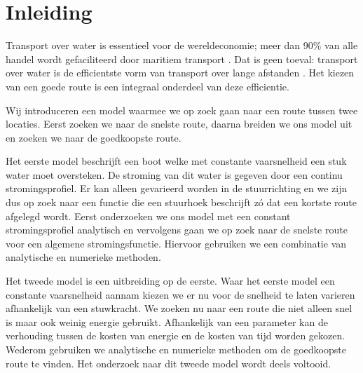\chapter{Inleiding}
Transport over water is essentieel voor de wereldeconomie; meer dan 90\% van alle handel wordt gefaciliteerd door maritiem transport \cite{wereldwijdeHandel}. Dat is geen toeval: transport over water is de efficientste vorm van transport over lange afstanden \cite{efficientstTransport}. Het kiezen van een goede route is een integraal onderdeel van deze efficientie.

Wij introduceren een model waarmee we op zoek gaan naar een route tussen twee locaties. Eerst zoeken we naar de snelste route, daarna breiden we ons model uit en zoeken we naar de goedkoopste route.

Het eerste model beschrijft een boot welke met constante vaarsnelheid een stuk water moet oversteken. 
De stroming van dit water is gegeven door een continu stromingsprofiel. 
Er kan alleen gevarieerd worden in de stuurrichting en we zijn dus op zoek naar een functie die een stuurhoek beschrijft z\'o dat een kortste route afgelegd wordt. Eerst onderzoeken we ons model met een constant stromingsprofiel analytisch en vervolgens gaan we op zoek naar de snelste route voor een algemene stromingsfunctie. Hiervoor gebruiken we een combinatie van analytische en numerieke methoden.

Het tweede model is een uitbreiding op de eerste. Waar het eerste model een constante vaarsnelheid aannam kiezen we er nu voor de snelheid te laten varieren afhankelijk van een stuwkracht. We zoeken nu naar een route die niet alleen snel is maar ook weinig energie gebruikt. Afhankelijk van een parameter kan de verhouding tussen de kosten van energie en de kosten van tijd worden gekozen. Wederom gebruiken we analytische en numerieke methoden om de goedkoopste route te vinden. Het onderzoek naar dit tweede model wordt deels voltooid.
